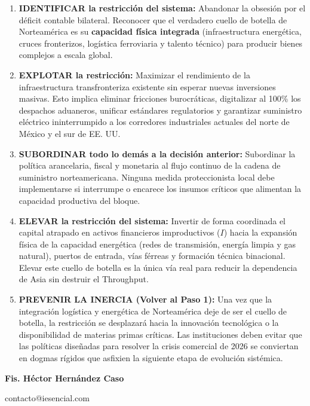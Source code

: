 \documentclass[12pt,letterpaper]{article}
\providecommand{\tightlist}{%
  \setlength{\itemsep}{0pt}\setlength{\parskip}{0pt}}
\begin{document}
\begin{enumerate}
\def\labelenumi{\arabic{enumi}.}
\tightlist
\item
  \textbf{IDENTIFICAR la restricción del sistema:} Abandonar la obsesión
  por el déficit contable bilateral. Reconocer que el verdadero cuello
  de botella de Norteamérica es su \textbf{capacidad física integrada}
  (infraestructura energética, cruces fronterizos, logística ferroviaria
  y talento técnico) para producir bienes complejos a escala global.
\item
  \textbf{EXPLOTAR la restricción:} Maximizar el rendimiento de la
  infraestructura transfronteriza existente sin esperar nuevas
  inversiones masivas. Esto implica eliminar fricciones burocráticas,
  digitalizar al 100\% los despachos aduaneros, unificar estándares
  regulatorios y garantizar suministro eléctrico ininterrumpido a los
  corredores industriales actuales del norte de México y el sur de EE.
  UU.
\item
  \textbf{SUBORDINAR todo lo demás a la decisión anterior:} Subordinar
  la política arancelaria, fiscal y monetaria al flujo continuo de la
  cadena de suministro norteamericana. Ninguna medida proteccionista
  local debe implementarse si interrumpe o encarece los insumos críticos
  que alimentan la capacidad productiva del bloque.
\item
  \textbf{ELEVAR la restricción del sistema:} Invertir de forma
  coordinada el capital atrapado en activos financieros improductivos
  (\(I\)) hacia la expansión física de la capacidad energética (redes de
  transmisión, energía limpia y gas natural), puertos de entrada, vías
  férreas y formación técnica binacional. Elevar este cuello de botella
  es la única vía real para reducir la dependencia de Asia sin destruir
  el Throughput.
\item
  \textbf{PREVENIR LA INERCIA (Volver al Paso 1):} Una vez que la
  integración logística y energética de Norteamérica deje de ser el
  cuello de botella, la restricción se desplazará hacia la innovación
  tecnológica o la disponibilidad de materias primas críticas. Las
  instituciones deben evitar que las políticas diseñadas para resolver
  la crisis comercial de 2026 se conviertan en dogmas rígidos que
  asfixien la siguiente etapa de evolución sistémica.
\end{enumerate}

\textbf{Fis. Héctor Hernández Caso}

contacto@iesencial.com
\end{document}
